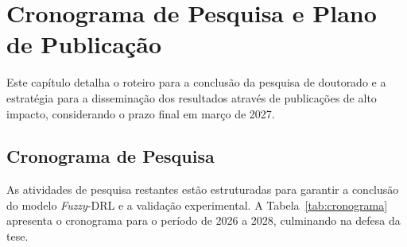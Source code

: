 \chapter{Cronograma de Pesquisa e Plano de Publicação}
\label{cap:cronograma-pesquisa}

Este capítulo detalha o roteiro para a conclusão da pesquisa de doutorado e a estratégia para a disseminação dos resultados através de publicações de alto impacto, considerando o prazo final em março de 2027.

\section{Cronograma de Pesquisa}
\label{sec:cronograma}

As atividades de pesquisa restantes estão estruturadas para garantir a conclusão do modelo \textit{\textit{Fuzzy}}-\gls{DRL} e a validação experimental. A Tabela~\ref{tab:cronograma} apresenta o cronograma para o período de 2026 a 2028, culminando na defesa da tese.

\begin{table}[ht!]
    \centering
\end{table}

